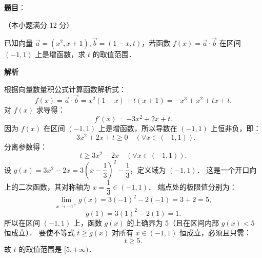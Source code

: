 \begin{answer}

\textbf{题目}：

（本小题满分 12 分）

已知向量 $\vec{a} = (x^2, x + 1), \vec{b} = (1 - x, t)$，若函数 $f(x) = \vec{a} \cdot \vec{b}$ 在区间 $(-1, 1)$ 上是增函数，求 $t$ 的取值范围．

\textbf{解析}

根据向量数量积公式计算函数解析式：
\nopagebreak[4]
\[
f(x) = \vec{a} \cdot \vec{b} = x^2(1 - x) + t(x + 1) = -x^3 + x^2 + tx + t.
\]
对 $f(x)$ 求导得：
\nopagebreak[4]
\[
f'(x) = -3x^2 + 2x + t.
\]
因为 $f(x)$ 在区间 $(-1, 1)$ 上是增函数，所以导数在 $(-1, 1)$ 上恒非负，即：
\nopagebreak[4]
\[
-3x^2 + 2x + t \geqslant 0 \quad (\forall x \in (-1, 1)).
\]
分离参数得：
\nopagebreak[4]
\[
t \geqslant 3x^2 - 2x \quad (\forall x \in (-1, 1)).
\]
设 $g(x) = 3x^2 - 2x = 3\left(x - \dfrac{1}{3}\right)^2 - \dfrac{1}{3}$，定义域为 $(-1, 1)$．
这是一个开口向上的二次函数，其对称轴为 $x = \dfrac{1}{3} \in (-1, 1)$．
端点处的极限值分别为：
\nopagebreak[4]
\[
\lim_{x\to -1^+} g(x) = 3(-1)^2 - 2(-1) = 3 + 2 = 5,
\]
\nopagebreak[4]
\[
g(1) = 3(1)^2 - 2(1) = 1.
\]
所以在区间 $(-1, 1)$ 上，函数 $g(x)$ 的上确界为 5（且在区间内部 $g(x) < 5$ 恒成立）．
要使不等式 $t \geqslant g(x)$ 对所有 $x \in (-1, 1)$ 恒成立，必须且只需：
\nopagebreak[4]
\[
t \geqslant 5.
\]
故 $t$ 的取值范围是 $[5, +\infty)$．

\gkanswer{答案：$[5, +\infty)$。}

\end{answer}
